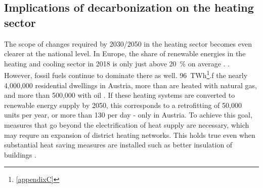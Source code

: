 \subsection{Implications of decarbonization on the heating sector}
The scope of changes required by 2030/2050 in the heating sector becomes even clearer at the national level. In Europe, the share of renewable energies in the heating and cooling sector in 2018 is only just above \SI{20}{\%} on average \cite{eurostat_reference}. . However, fossil fuels continue to dominate there as well.  \SI{96}{TWh}\footnote{\ref{appendixC} }.f the nearly 4,000,000 residential dwellings in Austria, more than  are heated with natural gas, and more than 500,000 with oil \cite{statistik_austria}. If these heating systems are converted to renewable energy supply by 2050, this corresponds to a retrofitting of 50,000 units per year, or more than 130 per day - only in Austria. To achieve this goal, measures that go beyond the electrification of heat supply are necessary, which may requre an expansion of district heating networks. This holds true even when substantial heat saving measures are installed such as better insulation of buildings \cite{jalil2018spatially}.\vspace{0.3cm}

